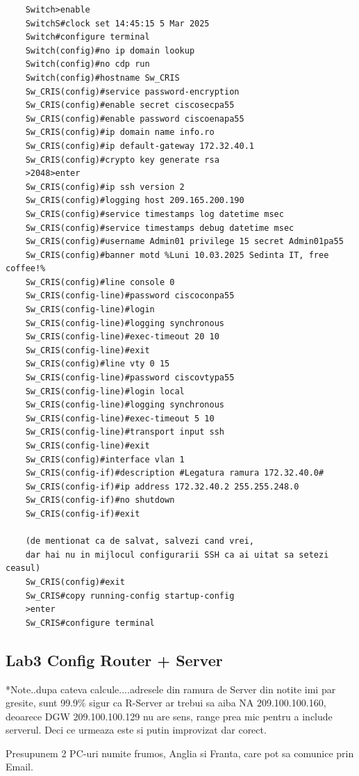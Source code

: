 \documentclass{article}
\begin{document}
\begin{verbatim}
    Switch>enable
    SwitchS#clock set 14:45:15 5 Mar 2025
    Switch#configure terminal
    Switch(config)#no ip domain lookup
    Switch(config)#no cdp run
    Switch(config)#hostname Sw_CRIS
    Sw_CRIS(config)#service password-encryption
    Sw_CRIS(config)#enable secret ciscosecpa55
    Sw_CRIS(config)#enable password ciscoenapa55
    Sw_CRIS(config)#ip domain name info.ro
    Sw_CRIS(config)#ip default-gateway 172.32.40.1
    Sw_CRIS(config)#crypto key generate rsa
    >2048>enter
    Sw_CRIS(config)#ip ssh version 2
    Sw_CRIS(config)#logging host 209.165.200.190
    Sw_CRIS(config)#service timestamps log datetime msec
    Sw_CRIS(config)#service timestamps debug datetime msec
    Sw_CRIS(config)#username Admin01 privilege 15 secret Admin01pa55
    Sw_CRIS(config)#banner motd %Luni 10.03.2025 Sedinta IT, free coffee!%
    Sw_CRIS(config)#line console 0
    Sw_CRIS(config-line)#password ciscoconpa55
    Sw_CRIS(config-line)#login
    Sw_CRIS(config-line)#logging synchronous
    Sw_CRIS(config-line)#exec-timeout 20 10
    Sw_CRIS(config-line)#exit
    Sw_CRIS(config)#line vty 0 15
    Sw_CRIS(config-line)#password ciscovtypa55
    Sw_CRIS(config-line)#login local
    Sw_CRIS(config-line)#logging synchronous
    Sw_CRIS(config-line)#exec-timeout 5 10
    Sw_CRIS(config-line)#transport input ssh
    Sw_CRIS(config-line)#exit
    Sw_CRIS(config)#interface vlan 1
    Sw_CRIS(config-if)#description #Legatura ramura 172.32.40.0#
    Sw_CRIS(config-if)#ip address 172.32.40.2 255.255.248.0
    Sw_CRIS(config-if)#no shutdown
    Sw_CRIS(config-if)#exit

    (de mentionat ca de salvat, salvezi cand vrei, 
    dar hai nu in mijlocul configurarii SSH ca ai uitat sa setezi ceasul)
    Sw_CRIS(config)#exit 
    Sw_CRIS#copy running-config startup-config
    >enter
    Sw_CRIS#configure terminal
\end{verbatim}

\subsection{Lab3 Config Router + Server}
*Note..dupa cateva calcule....adresele din ramura de Server din notite imi par gresite, sunt 99.9\% sigur ca R-Server ar trebui sa aiba NA 209.100.100.160, deoarece DGW 209.100.100.129 nu are sens, range prea mic pentru a include serverul. Deci ce urmeaza este si putin improvizat dar corect.

Presupunem 2 PC-uri numite frumos, Anglia si Franta, care pot sa comunice prin Email.
\end{document}
